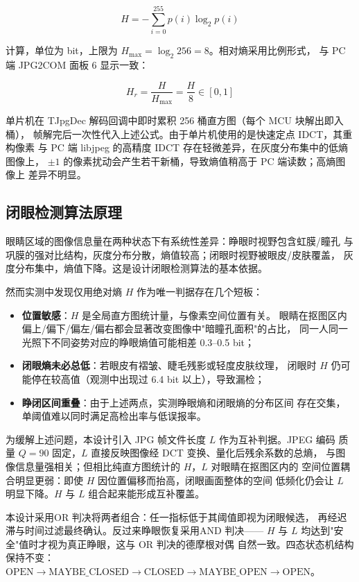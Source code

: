 \documentclass[a4paper]{article}
\begin{document}
\[
H = -\sum_{i=0}^{255} p(i) \log_2 p(i)
\]

计算，单位为 bit，上限为 $H_{\max} = \log_2 256 = 8$。相对熵采用比例形式，
与 PC 端 JPG2COM 面板 6 显示一致：

\[
H_r = \frac{H}{H_{\max}} = \frac{H}{8} \in [0, 1]
\]

单片机在 TJpgDec 解码回调中即时累积 256 桶直方图（每个 MCU 块解出即入桶），
帧解完后一次性代入上述公式。由于单片机使用的是快速定点 IDCT，其重构像素
与 PC 端 libjpeg 的高精度 IDCT 存在轻微差异，在灰度分布集中的低熵图像上，
$\pm 1$ 的像素扰动会产生若干新桶，导致熵值稍高于 PC 端读数；高熵图像上
差异不明显。


\subsection{闭眼检测算法原理}

眼睛区域的图像信息量在两种状态下有系统性差异：睁眼时视野包含虹膜/瞳孔
与巩膜的强对比结构，灰度分布分散，熵值较高；闭眼时视野被眼皮/皮肤覆盖，
灰度分布集中，熵值下降。这是设计闭眼检测算法的基本依据。

然而实测中发现仅用绝对熵 $H$ 作为唯一判据存在几个短板：

\begin{itemize}
\item \textbf{位置敏感}：$H$ 是全局直方图统计量，与像素空间位置有关。
眼睛在抠图区内偏上/偏下/偏左/偏右都会显著改变图像中"暗瞳孔面积"的占比，
同一人同一光照下不同姿势对应的睁眼熵值可能相差 0.3--0.5 bit；
\item \textbf{闭眼熵未必总低}：若眼皮有褶皱、睫毛残影或轻度皮肤纹理，
闭眼时 $H$ 仍可能停在较高值（观测中出现过 6.4 bit 以上），导致漏检；
\item \textbf{睁闭区间重叠}：由于上述两点，实测睁眼熵和闭眼熵的分布区间
存在交集，单阈值难以同时满足高检出率与低误报率。
\end{itemize}

为缓解上述问题，本设计引入 JPG 帧文件长度 $L$ 作为互补判据。JPEG 编码
质量 $Q=90$ 固定，$L$ 直接反映图像经 DCT 变换、量化后残余系数的总熵，
与图像信息量强相关；但相比纯直方图统计的 $H$，$L$ 对眼睛在抠图区内的
空间位置耦合明显更弱：即使 $H$ 因位置偏移而抬高，闭眼画面整体的空间
低频化仍会让 $L$ 明显下降。$H$ 与 $L$ 组合起来能形成互补覆盖。

本设计采用OR 判决将两者组合：任一指标低于其阈值即视为闭眼候选，
再经迟滞与时间过滤最终确认。反过来睁眼恢复采用AND 判决——
$H$ 与 $L$ 均达到"安全"值时才视为真正睁眼，这与 OR 判决的德摩根对偶
自然一致。四态状态机结构保持不变：
$\mathrm{OPEN} \to \mathrm{MAYBE\_CLOSED} \to \mathrm{CLOSED}
\to \mathrm{MAYBE\_OPEN} \to \mathrm{OPEN}$。
\end{document}
